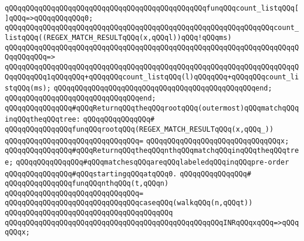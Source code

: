 \verb|qQQqqQQqqQQqqQQqqQQqqQQqqQQqqQQqqQQqqQQqqQQqqQQqfunqQQqcount_listqQQq[]qQQq=>qQQqqQQqqQQq0;|\newline
\newline
\verb|qQQqqQQqqQQqqQQqqQQqqQQqqQQqqQQqqQQqqQQqqQQqqQQqqQQqqQQqqQQqqQQqcount_listqQQq((REGEX_MATCH_RESULTqQQq(x,qQQql))qQQq!qQQqms)|\newline
\verb|qQQqqQQqqQQqqQQqqQQqqQQqqQQqqQQqqQQqqQQqqQQqqQQqqQQqqQQqqQQqqQQqqQQqqQQqqQQqqQQq=>|\newline
\verb|qQQqqQQqqQQqqQQqqQQqqQQqqQQqqQQqqQQqqQQqqQQqqQQqqQQqqQQqqQQqqQQqqQQqqQQqqQQqqQQq1qQQqqQQq+qQQqqQQqcount_listqQQq(l)qQQqqQQq+qQQqqQQqcount_listqQQq(ms);|\newline
\verb|qQQqqQQqqQQqqQQqqQQqqQQqqQQqqQQqqQQqqQQqqQQqqQQqend;|\newline
\verb|qQQqqQQqqQQqqQQqqQQqqQQqqQQqqQQqend;|\newline
\newline
\newline
\verb|qQQqqQQqqQQqqQQq#qQQqReturnqQQqtheqQQqrootqQQq(outermost)qQQqmatchqQQqinqQQqtheqQQqtree:|\newline
\verb|qQQqqQQqqQQqqQQq#|\newline
\verb|qQQqqQQqqQQqqQQqfunqQQqrootqQQq(REGEX_MATCH_RESULTqQQq(x,qQQq_))|\newline
\verb|qQQqqQQqqQQqqQQqqQQqqQQqqQQqqQQq=|\newline
\verb|qQQqqQQqqQQqqQQqqQQqqQQqqQQqqQQqx;|\newline
\newline
\newline
\newline
\verb|qQQqqQQqqQQqqQQq#qQQqReturnqQQqtheqQQqnthqQQqmatchqQQqinqQQqtheqQQqtree;|\newline
\verb|qQQqqQQqqQQqqQQq#qQQqmatchesqQQqareqQQqlabeledqQQqinqQQqpre-order|\newline
\verb|qQQqqQQqqQQqqQQq#qQQqstartingqQQqatqQQq0.|\newline
\verb|qQQqqQQqqQQqqQQq#|\newline
\verb|qQQqqQQqqQQqqQQqfunqQQqnthqQQq(t,qQQqn)|\newline
\verb|qQQqqQQqqQQqqQQqqQQqqQQqqQQqqQQq=|\newline
\verb|qQQqqQQqqQQqqQQqqQQqqQQqqQQqqQQqcaseqQQq(walkqQQq(n,qQQqt))|\newline
\verb|qQQqqQQqqQQqqQQqqQQqqQQqqQQqqQQqqQQqqQQq|\newline
\verb|qQQqqQQqqQQqqQQqqQQqqQQqqQQqqQQqqQQqqQQqqQQqqQQqqQQqINRqQQqxqQQq=>qQQqqQQqx;|\newline
